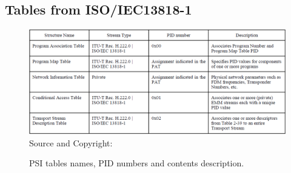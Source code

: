 \documentclass[
	12pt,				%
	openright,			%
	twoside,			%
	a4paper,			%
	brazil,
	french,				%
	english
	]{abntex2}
\begin{document}
\begin{apendicesenv}

\end{apendicesenv}



\begin{anexosenv}

\partanexos




\chapter{Tables from ISO/IEC13818-1}
\label{tables_iso}

\begin{figure}[!hb]
\centering
\caption{PSI tables names, PID numbers and contents description.}
\includegraphics[width=0.7\linewidth]{figuras/tab_psi_tables_names_pids.png}
\\Source and Copyright: 
\label{fig:tab_psi_tables_names_pids}
\end{figure}


\end{anexosenv}
\end{document}
